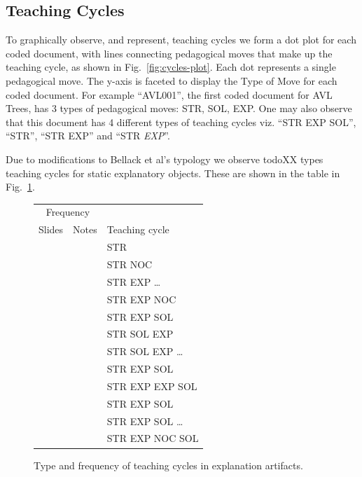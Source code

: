 \documentclass[conference]{IEEEtran}
\begin{document}
\subsection{Teaching Cycles}

To graphically observe, and represent, teaching cycles we form a dot plot for
each coded document, with lines connecting pedagogical moves that make up the
teaching cycle, as shown in Fig.~\ref{fig:cycles-plot}.
%
Each dot represents a single pedagogical move. The y-axis is faceted to display
the Type of Move for each coded document. For example ``AVL001'', the first
coded document for AVL Trees, has 3 types of pedagogical moves: STR, SOL, EXP.
One may also observe that this document has 4 different types of teaching cycles
viz. ``STR EXP SOL'', ``STR'', ``STR EXP'' and ``STR \emph{EXP}''.


Due to modifications to Bellack et al's typology we observe todo{XX} types
teaching cycles for static explanatory objects. These are shown in the table in
Fig.~\ref{fig:cycles-table}.


\newcommand{\Freq}[1]{\ensuremath{\text{Freq}_\text{#1}}}

\begin{figure}
\centering\footnotesize
\begin{tabular}{r|r|l}
\multicolumn{2}{c}{Frequency} & \\
\multicolumn{1}{c}{Slides}
  & \multicolumn{1}{c}{Notes}
  & \multicolumn{1}{l}{Teaching cycle} \\ \hline
& & STR \\
& & STR NOC \\
& & STR EXP \ldots \\
& & STR EXP NOC \\
& & STR EXP SOL \\
& & STR SOL EXP \\
& & STR SOL EXP \ldots \\
& & STR EXP SOL \\
& & STR EXP EXP SOL \\
& & STR EXP SOL \\
& & STR EXP SOL \ldots \\
& & STR EXP NOC SOL \\
\end{tabular}
\caption{Type and frequency of teaching cycles in explanation artifacts.}
\label{fig:cycles-table}
\end{figure}
\end{document}
